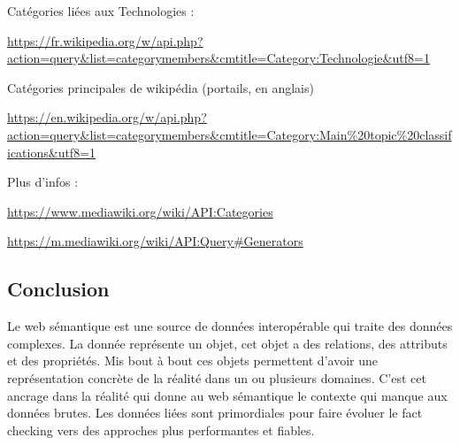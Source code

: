 Catégories liées aux Technologies :

\url{https://fr.wikipedia.org/w/api.php?action=query&list=categorymembers&cmtitle=Category:Technologie&utf8=1}

Catégories principales de wikipédia (portails, en anglais)

\url{https://en.wikipedia.org/w/api.php?action=query&list=categorymembers&cmtitle=Category:Main%20topic%20classifications&utf8=1}

Plus d'infos : 

\url{https://www.mediawiki.org/wiki/API:Categories}

\url{https://m.mediawiki.org/wiki/API:Query#Generators}
\fi

\subsection{Conclusion}

Le web sémantique est une source de données interopérable qui traite des données complexes. La donnée représente un objet, cet objet a des relations, des attributs et des propriétés. Mis bout à bout ces objets permettent d'avoir une représentation concrète de la réalité dans un ou plusieurs domaines. C'est cet ancrage dans la réalité qui donne au web sémantique le contexte qui manque aux données brutes. Les données liées sont primordiales pour faire évoluer le fact checking vers des approches plus performantes et fiables.